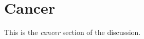 \section{Cancer}
\label{cancer-discussion}

This is the \emph{cancer} section of the discussion.

\clearpage

